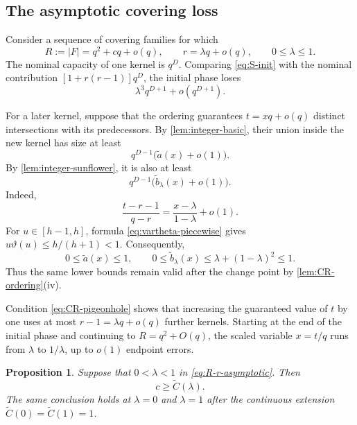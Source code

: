 \documentclass[11pt,reqno]{amsart}
\numberwithin{equation}{section}
\newtheorem{proposition}[proposition]{Proposition}
\theoremstyle{definition}
\theoremstyle{remark}
\newcommand{\cF}{\mathcal F}
\newcommand{\cC}{\mathcal C}
\newcommand{\abs}[1]{\lvert#1\rvert}
\def\mathcal#1{#1}%
\begin{document}
\subsection{The asymptotic covering loss}

Consider a sequence of covering families for which
\begin{equation}\label{eq:R-r-asymptotic}
 R:=\abs{\cF}=q^2+cq+o(q),
 \qquad
 r=\lambda q+o(q),
 \qquad
 0\le\lambda\le1.
\end{equation}
The nominal capacity of one kernel is $q^D$.  Comparing
\eqref{eq:S-init} with the nominal contribution
$[1+r(r-1)]q^D$, the initial phase loses
\begin{equation}\label{eq:initial-saving}
 \lambda^3q^{D+1}+o(q^{D+1}).
\end{equation}

For a later kernel, suppose that the ordering guarantees
$t=xq+o(q)$ distinct intersections with its predecessors.  By
\cref{lem:integer-basic}, their union inside the new kernel has size at least
\begin{equation}\label{eq:atilde-asymptotic}
 q^{D-1}\bigl(\widetilde a(x)+o(1)\bigr).
\end{equation}
By \cref{lem:integer-sunflower}, it is also at least
\begin{equation}\label{eq:btilde-asymptotic}
 q^{D-1}\bigl(\widetilde b_\lambda(x)+o(1)\bigr).
\end{equation}
Indeed,
\[
 \frac{t-r-1}{q-r}
 =\frac{x-\lambda}{1-\lambda}+o(1).
\]
For $u\in[h-1,h]$, formula \eqref{eq:vartheta-piecewise} gives
$u\vartheta(u)\le h/(h+1)<1$.  Consequently,
\[
 0\le\widetilde a(x)\le1,
 \qquad
 0\le\widetilde b_\lambda(x)\le
 \lambda+(1-\lambda)^2\le1.
\]
Thus the same lower bounds remain valid after the change point by
\cref{lem:CR-ordering}(iv).

Condition \eqref{eq:CR-pigeonhole} shows that increasing the guaranteed value of $t$ by one uses at most $r-1=\lambda q+o(q)$ further kernels.  Starting at the end of the initial phase and continuing to
$R=q^2+O(q)$, the scaled variable $x=t/q$ runs from
$\lambda$ to $1/\lambda$, up to $o(1)$ endpoint errors.

\begin{proposition}\label{prop:Ctilde-lambda}
Suppose that $0<\lambda<1$ in \eqref{eq:R-r-asymptotic}.  Then
\begin{equation}\label{eq:c-lower-Ctilde-lambda}
 c\ge\widetilde{\cC}(\lambda).
\end{equation}
The same conclusion holds at $\lambda=0$ and $\lambda=1$ after the continuous extension
$\widetilde{\cC}(0)=\widetilde{\cC}(1)=1$.
\end{proposition}
\end{document}
